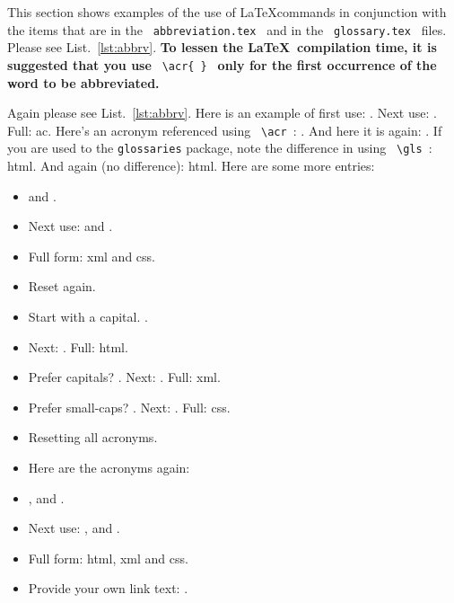 This section shows examples of the use of \LaTeX commands in conjunction with the items that are in the \verb| abbreviation.tex | and in the \verb| glossary.tex | files.  Please see List.~\ref{lst:abbrv}. \textbf{To lessen the \LaTeX \ compilation time, it is suggested that you use} \verb| \acr{ } | \textbf{only for the first occurrence of the word to be abbreviated.}

Again please see List.~\ref{lst:abbrv}. Here is an example of first use: . Next use: . Full: \gls{ac}.  Here's an acronym referenced using \verb| \acr |: .  And here it is again: . If you are used to the \texttt{glossaries} package, note the difference in using \verb| \gls |: \gls{html}. And again (no difference): \gls{html}. Here are some more entries:

\begin{itemize}

	\item {} and .

	\item Next use:  and .

	\item Full form: \gls{xml} and \gls{css}.

	\item Reset again. 

	\item Start with a capital. .

	\item Next: . Full: \Gls{html}.

	\item Prefer capitals? \renewcommand{\acronymfont}[1]{\MakeTextUppercase{#1}} . Next: . Full: \gls{xml}.

	\item Prefer small-caps? \renewcommand{\acronymfont}[1]{\textsc{#1}} . Next: . Full: \gls{css}.

	\item Resetting all acronyms.

	\item Here are the acronyms again:

	\item {},  and .

	\item Next use: ,  and .

	\item Full form: \Gls{html}, \gls{xml} and \gls{css}.

	\item Provide your own link text: .

\end{itemize}



